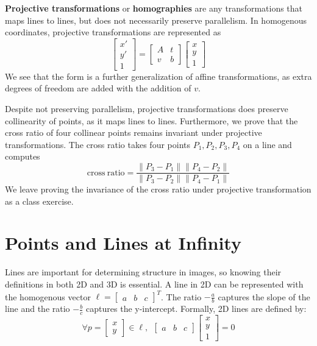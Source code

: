 \documentclass[a4paper, 12pt]{article}
\renewcommand\emph{\textbf}
\begin{document}
\emph{Projective transformations} or \emph{homographies} are any transformations that maps lines to lines, but does not necessarily preserve parallelism. In homogenous coordinates, projective transformations are represented as
\begin{equation*}
    \begin{bmatrix}x'\\y'\\1\end{bmatrix} = \begin{bmatrix}A & t\\ v & b\end{bmatrix}\begin{bmatrix}x\\y\\1\end{bmatrix}
\end{equation*}
We see that the form is a further generalization of affine transformations, as extra degrees of freedom are added with the addition of $v$. 

Despite not preserving parallelism, projective transformations does preserve collinearity of points, as it maps lines to lines. Furthermore, we prove that the cross ratio of four collinear points remains invariant under projective transformations. The cross ratio takes four points $P_1, P_2, P_3, P_4$ on a line and computes
\begin{equation}
    \mathrm{cross\ ratio} = \frac{\|P_3-P_1\|\|P_4-P_2\|}{\|P_3-P_2\|\|P_4-P_1\|}
\end{equation}
We leave proving the invariance of the cross ratio under projective transformation as a class exercise.

\section{Points and Lines at Infinity}
Lines are important for determining structure in images, so knowing their definitions in both 2D and 3D is essential. A line in 2D can be represented with the homogenous vector $\ell = \begin{bmatrix}a & b & c \end{bmatrix}^T$. The ratio $-\frac{a}{b}$ captures the slope of the line and the ratio $-\frac{b}{c}$ captures the y-intercept. Formally, 2D lines are defined by:
\begin{equation}
\forall p = \begin{bmatrix}x\\y\end{bmatrix} \in \ell,\ \  \begin{bmatrix}a & b & c\end{bmatrix}\begin{bmatrix}x\\y\\1\end{bmatrix} = 0
\end{equation}
\end{document}
